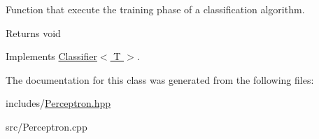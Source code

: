 Function that execute the training phase of a classification algorithm. 

\begin{DoxyReturn}{Returns}
void 
\end{DoxyReturn}


Implements \hyperlink{class_classifier_a120849bfdfa3ba7a0388b32b2d76bf4f}{Classifier$<$ T $>$}.



The documentation for this class was generated from the following files\+:\begin{DoxyCompactItemize}
\item 
includes/\hyperlink{_perceptron_8hpp}{Perceptron.\+hpp}\item 
src/Perceptron.\+cpp\end{DoxyCompactItemize}
